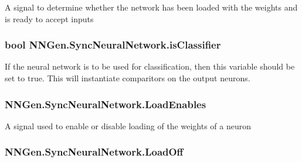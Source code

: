 A signal to determine whether the network has been loaded with the weights and is ready to accept inputs 

\hypertarget{class_n_n_gen_1_1_sync_neural_network_ac4b6c7f973b66d41e7e12795b027887d}{}
\subsubsection[{is\+Classifier}]{\setlength{\rightskip}{0pt plus 5cm}bool N\+N\+Gen.\+Sync\+Neural\+Network.\+is\+Classifier\hspace{0.3cm}{\ttfamily [get]}}\label{class_n_n_gen_1_1_sync_neural_network_ac4b6c7f973b66d41e7e12795b027887d}


If the neural network is to be used for classification, then this variable should be set to true. This will instantiate comparitors on the output neurons. 

\hypertarget{class_n_n_gen_1_1_sync_neural_network_a5005f0c6c9b6377dfc66c2894251f4dd}{}
\subsubsection[{Load\+Enables}]{ N\+N\+Gen.\+Sync\+Neural\+Network.\+Load\+Enables\hspace{0.3cm}{\ttfamily [get]}}\label{class_n_n_gen_1_1_sync_neural_network_a5005f0c6c9b6377dfc66c2894251f4dd}


A signal used to enable or disable loading of the weights of a neuron 

\hypertarget{class_n_n_gen_1_1_sync_neural_network_af587100e0516b187c280dc23b2c226e0}{}
\subsubsection[{Load\+Off}]{ N\+N\+Gen.\+Sync\+Neural\+Network.\+Load\+Off\hspace{0.3cm}{\ttfamily [get]}}\label{class_n_n_gen_1_1_sync_neural_network_af587100e0516b187c280dc23b2c226e0}


